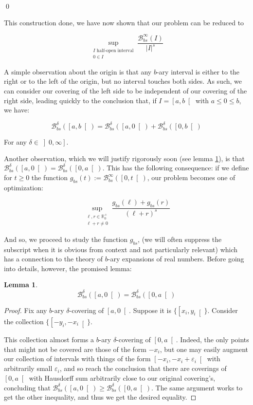 \documentclass[11pt, reqno]{amsart}
\newcommand{\R}{\mathbb{R}}
\newcommand{\BB}{\mathcal{B}}
\newtheorem{lemma}{Lemma}
\begin{document}
\qed

This construction done, we have now shown that our problem can be reduced to


\[\sup_{\substack{\text{$I$ half-open interval}\\ 0 \in I}} \frac{\BB_{bs}^\infty(I)}{\lvert I \rvert^s}\]

A simple observation about the origin is that any $b$-ary interval is either to the right or to the left of the origin, but no interval touches both sides. As such, we can consider our covering of the left side to be independent of our covering of the right side, leading quickly to the conclusion that, if $I = \left[ a, b \right[$ with $a \leq 0 \leq b$, we have:

\[\BB_{bs}^\delta(\left[a, b\right[) = \BB_{bs}^\delta(\left[a, 0\right[) + \BB_{bs}^\delta(\left[0, b\right[)\]

For any $\delta \in \left]0, \infty \right]$.

Another observation, which we will justify rigorously soon (see lemma \ref{sidedoesntmatter}), is that $\BB_{bs}^\delta(\left[a, 0\right[) = \BB_{bs}^\delta(\left[0, a\right[)$. This has the following consequence: if we define for $t \geq 0$ the function $g_{bs}(t) := \BB_{bs}^\infty(\left[0, t \right[)$, our problem becomes one of optimization:

\[ \sup_{\substack{\ell,r \in \R^+_0\\\ell+r \neq 0}} \frac{g_{bs}(\ell) + g_{bs}(r)}{(\ell + r)^s} \]

And so, we proceed to study the function $g_{bs}$, (we will often suppress the subscript when it is obvious from context and not particularly relevant) which has a connection to the theory of $b$-ary expansions of real numbers. Before going into details, however, the promised lemma:

\begin{lemma} \label{sidedoesntmatter}
\[\BB_{bs}^\delta(\left[a, 0\right[) = \BB_{bs}^\delta(\left[0, a\right[)\]
\end{lemma}

\begin{proof}
Fix any $b$-ary $\delta$-covering of $\left[a, 0\right[$. Suppose it is $\{\left[x_i, y_i\right[\}$. Consider the collection $\{\left[-y_i, -x_i\right[\}$. 

This collection almost forms a $b$-ary $\delta$-covering of $\left[0, a\right[$. Indeed, the only points that might not be covered are those of the form $-x_i$, but one may easily augment our collection of intervals with things of the form $\left[ -x_i, -x_i + \varepsilon_i \right[$ with arbitrarily small $\varepsilon_i$, and so reach the conclusion that there are coverings of $\left[0, a\right[$ with Hausdorff sum arbitrarily close to our original covering's, concluding that $\BB_{bs}^\delta(\left[a, 0\right[) \geq \BB_{bs}^\delta(\left[0, a\right[)$. The same argument works to get the other inequality, and thus we get the desired equality.
\end{proof}
\end{document}
